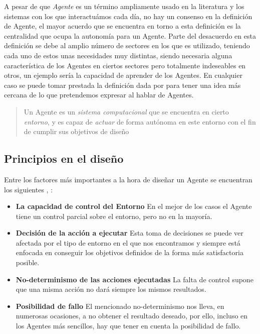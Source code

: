 A pesar de que \textit{Agente} es un término ampliamente usado en la literatura y los sistemas con los que interactuámos cada día, no hay un consenso en la definición de Agente, el mayor acuerdo que se encuentra en torno a esta definición es la centralidad que ocupa la autonomía para un Agente. Parte del desacuerdo en esta definición se debe al amplio número de sectores en los que es utilizado, teniendo cada uno de estos unas necesidades muy distintas, siendo necesaria alguna característica de los Agentes en ciertos sectores pero totalmente indeseables en otros, un ejemplo sería la capacidad de aprender de los Agentes. En cualquier caso se puede tomar prestada la definición dada por \cite{weiss1999multiagent} para tener una idea más cercana de lo que pretendemos expresar al hablar de Agentes.

\begin{quote}
Un Agente es un \textit{sistema computacional} que se encuentra en cierto \textit{entorno}, y es capaz de \textit{actuar} de forma autónoma en este entorno con el fin de cumplir sus objetivos de diseño
\end{quote}

\subsection{Principios en el diseño}

Entre los factores más importantes a la hora de diseñar un Agente se encuentran los siguientes \citep{russell2016artificial}, \citep{wooldridge2009introduction}:

\begin{itemize}
	\item\textbf{La capacidad de control del Entorno} En el mejor de los casos el Agente tiene un control parcial sobre el entorno, pero no en la mayoría.
	\item\textbf{Decisión de la acción a ejecutar} Esta toma de decisiones se puede ver afectada por el tipo de entorno en el que nos encontramos y siempre está enfocada en conseguir los objetivos definidos de la forma más satisfactoria posible.
	\item\textbf{No-determinismo de las acciones ejecutadas} La falta de control supone que una misma acción no dará siempre los mismos resultados.
	\item\textbf{Posibilidad de fallo} El mencionado no-determinismo nos lleva, en numerosas ocasiones, a no obtener el resultado deseado, por ello, incluso en los Agentes más sencillos, hay que tener en cuenta la posibilidad de fallo.
\end{itemize}

